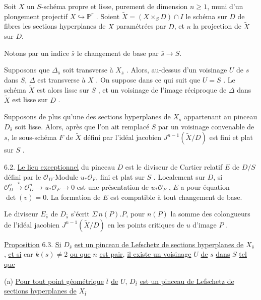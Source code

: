 Soit $X$ un $S$-schéma propre et lisse, purement de dimension $n \geq 1$, muni d'un plongement projectif $X \hookrightarrow \mathbb{P}^r$ . Soient $\widetilde{X} = (X \times_S D) \cap I$ le schéma sur $D$ de fibres les sections hyperplanes de $X$ paramétrées par $D$, et $u$ la projection de $\widetilde{X}$ sur $D$.

Notons par un indice $\bar{s}$ le changement de base par $\bar{s} \longrightarrow S$.

Supposons que $\Delta_{\bar{s}}$ soit transverse à $X_{\bar{s}}$ . Alors, au-dessus d'un voisinage $U$ de $s$ dans $S$, $\Delta$ est transverse à $X$ . On suppose dans ce qui suit que $U = S$ . Le schéma $\widetilde{X}$ est alors lisse sur $S$ , et un voisinage de l'image réciproque de $\Delta$ dans $\widetilde{X}$ est lisse sur $D$ .

Supposons de plus qu'une des sections hyperplanes de $X_{\bar{s}}$ appartenant au pinceau $D_{\bar{s}}$ soit lisse. Alors, après que l'on ait remplacé $S$ par un voisinage convenable de $s$, le sous-schéma $F$ de $\widetilde{X}$ défini par l'idéal jacobien $J^{n-1}(\widetilde{X}/D)$ est fini et plat sur $S$ .



6.2. \underline{Le lieu exceptionnel} du pinceau $D$ est le diviseur de Cartier relatif $E$ de $D/S$ défini par le $\mathcal{O}_D$-Module $u_*\mathcal{O}_F$, fini et plat sur $S$ . Localement sur $D$, si $\mathcal{O}_D^n \xrightarrow{\ v\ } \mathcal{O}_D^n \longrightarrow u_*\mathcal{O}_F \longrightarrow 0$ est une présentation de $u_*\mathcal{O}_F$ , $E$ a pour équation $\det(v) = 0$. La formation de $E$ est compatible à tout changement de base.

Le diviseur $E_{\bar{s}}$ de $D_{\bar{s}}$ s'écrit $\Sigma\, n(P).P$, pour $n(P)$ la somme des colongueurs de l'idéal jacobien $J^{n-1}(\widetilde{X}/D)$ en les points critiques de $u$ d'image $P$ .

\underline{Proposition} 6.3. \underline{Si} $D_{\bar{s}}$ \underline{est un pinceau de Lefschetz de sections hyperplanes de} $X_{\bar{s}}$ , \underline{et si} car $k(s) \neq 2$ \underline{ou que} $n$ \underline{est pair}, \underline{il existe un voisinage} $U$ \underline{de} $s$ \underline{dans} $S$ \underline{tel que}

(a) \underline{Pour tout point géométrique} $\bar{t}$ \underline{de} $U$, $D_{\bar{t}}$ \underline{est un pinceau de Lefschetz de sections hyperplanes de} $X_{\bar{t}}$

